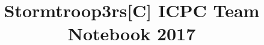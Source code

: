 \documentclass[10pt]{article}
\title{\vspace{-4ex}\Large{Stormtroop3rs[C] ICPC Team Notebook 2017}}
\author{}
\date{}
\begin{document}
\begin{landscape}
\begin{multicols}{2}

\maketitle
\vspace{-13ex}
\tableofcontents
\pagestyle{fancy}



\end{multicols}
\end{landscape}
\end{document}
